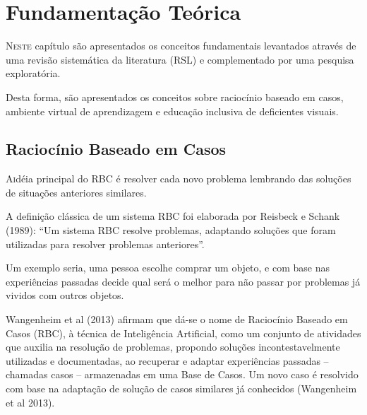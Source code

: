 \chapter{Fundamentação Teórica} \label{chap:Fundamentação}
\lettrine{N}{este} capítulo são apresentados os conceitos fundamentais levantados através de uma revisão sistemática da literatura (RSL) e complementado por uma pesquisa exploratória. 

Desta forma, são apresentados os conceitos sobre raciocínio baseado em casos, ambiente virtual de aprendizagem e educação inclusiva de deficientes visuais.

\section{Raciocínio Baseado em Casos}
\lettrine{A} idéia principal do RBC é resolver cada novo problema lembrando das soluções de situações anteriores similares.

A definição clássica de um sistema RBC foi elaborada por Reisbeck e Schank (1989): “Um
sistema RBC resolve problemas, adaptando soluções que foram utilizadas para resolver
problemas anteriores”.

Um exemplo seria, uma pessoa escolhe comprar um objeto, e com base nas experiências
passadas decide qual será o melhor para não passar por problemas já vividos com outros
objetos.

Wangenheim et al (2013) afirmam que dá-se o nome de Raciocínio Baseado em Casos (RBC), à técnica de Inteligência Artificial, como um conjunto de atividades que auxilia na resolução de problemas, propondo soluções incontestavelmente utilizadas e documentadas, ao recuperar e adaptar experiências passadas – chamadas casos – armazenadas em uma Base de Casos. Um novo caso é resolvido com base na adaptação de solução de casos similares já conhecidos (Wangenheim et al 2013).

